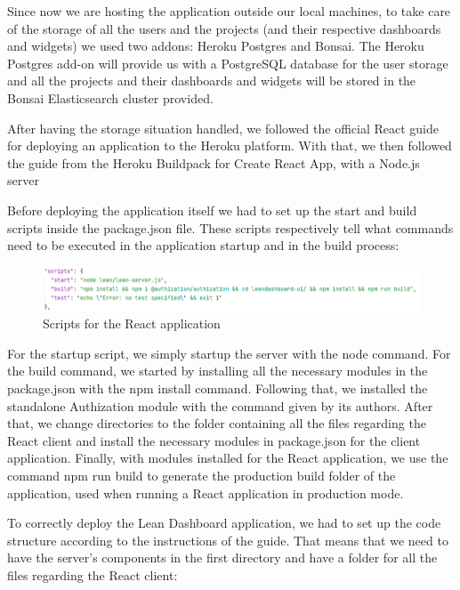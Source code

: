 \documentclass[a4paper,twoside,10pt]{report}
\begin{document}
Since now we are hosting the application outside our local machines, to take care of the storage of all the users and the projects (and their respective dashboards and widgets) we used two addons: Heroku Postgres\cite{HEROKUPOSTGRES} and Bonsai. The Heroku Postgres add-on will provide us with a PostgreSQL database for the user storage and all the projects and their dashboards and widgets will be stored in the Bonsai Elasticsearch cluster provided.

After having the storage situation handled, we followed the official React guide for deploying an application\cite{REACTDEPLOYMENT} to the Heroku platform. With that, we then followed the guide from the Heroku Buildpack for Create React App, with a Node.js server

\newpage
Before deploying the application itself we had to set up the start and build scripts inside the package.json file. These scripts respectively tell what commands need to be executed in the application startup and in the build process:


\begin{figure}[h!]
\center
  \includegraphics[width=\textwidth]{packageJsonScripts.png}
\caption{Scripts for the React application}
\end{figure}

For the startup script, we simply startup the server with the node command. For the build command, we started by installing all the necessary modules in the package.json with the npm install command. Following that, we installed the standalone Authization module with the command given by its authors.
After that, we change directories to the folder containing all the files regarding the React client and install the necessary modules in package.json for the client application.
Finally, with modules installed for the React application, we use the command npm run build to generate the production build folder of the application, used when running a React application in production mode.

To correctly deploy the Lean Dashboard application, we had to set up the code structure according to the instructions of the guide. That means that we need to have the server's components in the first directory and have a folder for all the files regarding the React client:
\end{document}
